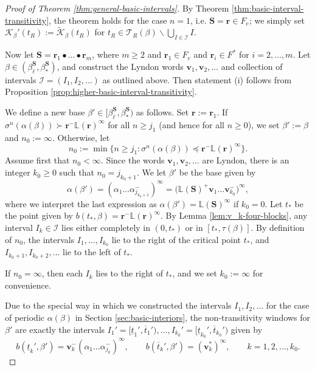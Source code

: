 \documentclass[11pt]{amsart}
\theoremstyle{definition}
\theoremstyle{remark}
\numberwithin{equation}{section}
\renewcommand{\L}{\ensuremath{\mathbb{L}}}
\newcommand{\II}{\mathcal{I}}
\newcommand{\Kt}{\widetilde{\mathcal{K}}}
\newcommand{\cs}{ {\mathbf{S}}}
\renewcommand{\r}{ {\mathbf{r}}}
\renewcommand{\v}{\mathbf{v}}
\newcommand{\f}{\infty}
\newcommand{\al}{\alpha}
\newcommand{\lle}{\preccurlyeq}
\newcommand{\si}{\sigma}
\begin{document}
\begin{proof}[Proof of Theorem \ref{thm:general-basic-intervals}]
By Theorem \ref{thm:basic-interval-transitivity}, the theorem holds for the case $n=1$, i.e. $\cs=\r\in{F_e}$; we simply set $\mathcal{K}_\beta'(t_R):=\Kt_\beta(t_R)$ for $t_R\in\mathcal{T}_R(\beta)\backslash \bigcup_{I\in\II}I$.

Now let $\cs=\r_1\bullet\dots\bullet\r_m$, where $m\geq 2$ and {$\r_1\in F_e$ and $\r_i\in F^*$ for $i=2,\dots,m$}. Let $\beta\in(\beta_\ell^{\cs},\beta_*^{\cs})$, and construct the Lyndon words $\v_1,\v_2,\dots$ and collection of intervals $\II=(I_1,I_2,\dots)$ as outlined above. Then statement (i) follows from Proposition \ref{prop:higher-basic-interval-transitivity}.

We define a new base $\beta'\in[\beta_\ell^{\cs},\beta_*^{\cs})$ as follows. Set $\r:=\r_1$. If $\si^n(\al(\beta)){\succ}\r^-\L(\r)^\f$ for all $n\geq j_1$ (and hence for all $n\geq 0$), we set $\beta':=\beta$ and $n_0:=\f$. Otherwise, let
\[
n_0:=\min\{n\geq j_1: \si^n(\al(\beta)){\lle}\r^-\L(\r)^\f\}.
\]
{Assume first that $n_0<\f$.}
Since the words $\v_1,\v_2,\dots$ are Lyndon, there is an integer $k_0\geq 0$ such that $n_0=j_{k_0+1}$. We let $\beta'$ be the base given by
\[
\al(\beta')=(\al_1\dots\al_{j_{k_0+1}}^-)^\f=\big(\L(\cs)^+\v_1\dots\v_{k_0}^-\big)^\f,
\]
where we interpret the last expression as $\al(\beta')=\L(\cs)^\f$ if $k_0=0$. Let $t_*$ be the point given by $b(t_*,\beta)=\r^-\L(\r)^\f$. By Lemma \ref{lem:v_k-four-blocks}, any interval $I_k\in\II$ lies either completely in $(0,t_*)$ or in $[t_*,\tau(\beta)]$. By definition of $n_0$, the intervals $I_1,\dots,I_{k_0}$ lie to the right of the critical point $t_*$, and $I_{k_0+1},I_{k_0+2},\dots$ lie to the left of $t_*$. 

If $n_0=\f$, then each $I_k$ lies to the right of $t_*$, and we set $k_0:=\f$ for convenience.

Due to the special way in which we constructed the intervals $I_1,I_2,\dots$ for the case of periodic $\al(\beta)$ in Section \ref{sec:basic-interiors}, the non-transitivity windows for $\beta'$ are exactly the intervals $I_1'=[\underline{t}_1',\overline{t}_1'),\dots,I_{k_0}'=[\underline{t}_{k_0}',\overline{t}_{k_0}')$ given by
\[
b(\underline{t}_k',\beta')=\v_k^-(\al_1\dots\al_{j_k}^-)^\f, \qquad b(\overline{t}_k',\beta')=(\v_k^*)^\f, \qquad k=1,2,\dots,k_0.
\]


\end{proof}
\end{document}
